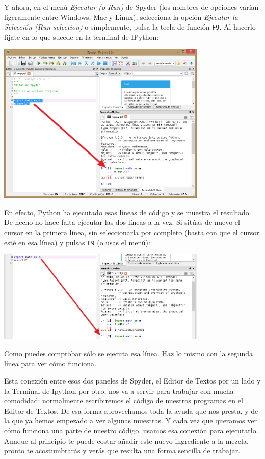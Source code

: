 \documentclass[10pt,a4paper]{article}\usepackage[]{graphicx}\usepackage[]{color}
\begin{document}
Y ahora, en el menú {\em Ejecutar (o Run)} de Spyder (los nombres de opciones varían ligeramente entre Windows, Mac y Linux), selecciona la opción {\em Ejecutar la Selección (Run selection)} o simplemente, pulsa la tecla de función {\tt F9}. Al hacerlo fíjate en lo que sucede en la terminal de IPython:
\begin{center}
\includegraphics[width=10cm]{../fig/Tut-02-py-24-EditorSpyder05.png}
\end{center}
En efecto, Python ha ejecutado esas líneas de código y se muestra el resultado. De hecho no hace falta ejecutar las dos líneas a la vez. Si sitúas de nuevo 
el cursor en la primera línea, sin seleccionarla por completo (basta con que el cursor esté en esa línea) y pulsas {\tt F9} (o usas el menú): 
\begin{center}
\includegraphics[width=10cm]{../fig/Tut-02-py-24-EditorSpyder06.png}
\end{center}
Como puedes comprobar sólo se ejecuta esa línea. Haz lo mismo con la segunda línea para ver cómo funciona. 

Esta conexión entre esos dos paneles de Spyder, el Editor de Textos por un lado y la Terminal de Ipython por otro, nos va a servir para trabajar con mucha comodidad: normalmente escribiremos el código de nuestros programas en el Editor de Textos. De esa forma aprovechamos toda la ayuda que nos presta, y de la que ya hemos empezado a ver algunas muestras. Y cada vez que queramos ver cómo funciona una parte de nuestro código, usamos esa conexión para ejecutarlo. Aunque al principio te puede costar añadir este nuevo ingrediente a la mezcla, pronto te acostumbrarás y verás que resulta una forma sencilla de trabajar. 
\end{document}
